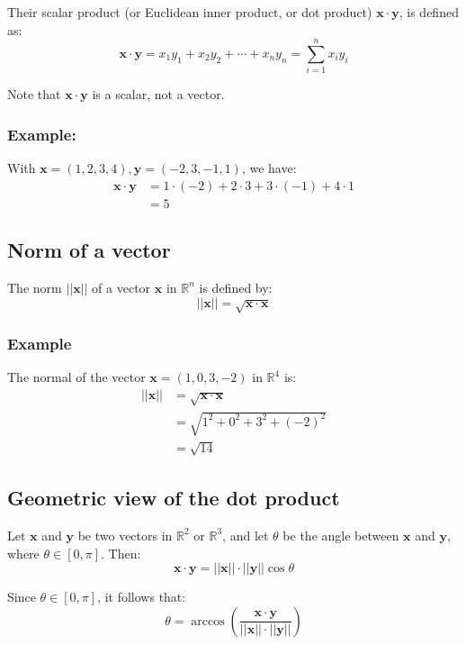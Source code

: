\documentclass[11pt]{article}
\begin{document}
Their scalar product (or Euclidean inner product, or dot product) \(\boldsymbol{x} \cdot \boldsymbol{y}\), is defined as:
\[\boldsymbol{x} \cdot \boldsymbol{y} = x_1 y_1 + x_2 y_2 + \cdots + x_n y_n = \sum_{i = 1}^n x_i y_i\]

Note that \(\boldsymbol{x} \cdot \boldsymbol{y}\) is a scalar, not a vector.
\subsubsection{Example:}
\label{sec:orgfe6f06e}
With \(\boldsymbol{x} = (1, 2, 3, 4), \boldsymbol{y} = (-2, 3, -1, 1)\), we have:
\begin{align*}
\boldsymbol{x} \cdot \boldsymbol{y} &= 1 \cdot (-2) + 2 \cdot 3 + 3 \cdot (-1) + 4 \cdot 1 \\
&= 5
\end{align*}
\subsection{Norm of a vector}
\label{sec:orge5e40f3}
The norm \(||\boldsymbol{x}||\) of a vector \(\boldsymbol{x}\) in \(\mathbb{R}^n\) is defined by:
\[||\boldsymbol{x}|| = \sqrt{\boldsymbol{x} \cdot \boldsymbol{x}}\]
\subsubsection{Example}
\label{sec:orgf51b8ad}
The normal of the vector \(\boldsymbol{x} = (1, 0, 3, -2)\) in \(\mathbb{R}^4\) is:
\begin{align*}
||\boldsymbol{x}|| &= \sqrt{\boldsymbol{x} \cdot \boldsymbol{x}} \\
&= \sqrt{1^2 + 0^2 + 3^2 + (-2)^2} \\
&= \sqrt{14}
\end{align*}
\subsection{Geometric view of the dot product}
\label{sec:org017bfa5}
Let \(\boldsymbol{x}\) and \(\boldsymbol{y}\) be two vectors in \(\mathbb{R}^2\) or \(\mathbb{R}^3\), and let \(\theta\) be the angle between \(\boldsymbol{x}\) and \(\boldsymbol{y}\), where \(\theta \in [0, \pi]\). Then:
\[\boldsymbol{x} \cdot \boldsymbol{y} = || \boldsymbol{x} || \cdot || \boldsymbol{y} || \cos \theta\]

Since \(\theta \in [0, \pi]\), it follows that:
\[\theta = \arccos \left( \frac{\boldsymbol{x} \cdot \boldsymbol{y}}{|| \boldsymbol{x} || \cdot || \boldsymbol{y} ||} \right)\]
\end{document}
